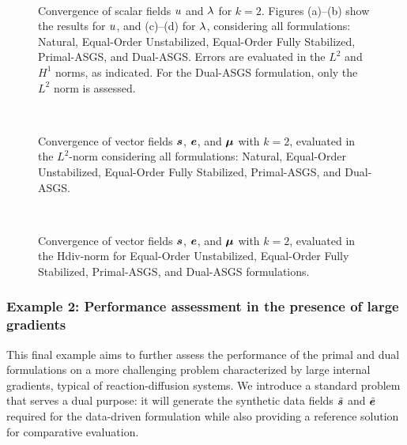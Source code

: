 
\begin{figure}[h!]
	\centering
	\caption{Convergence of scalar fields $u$ and $\lambda$ for $k = 2$. Figures (a)--(b) show the results for $u$, and (c)--(d) for $\lambda$, considering all formulations: Natural, Equal-Order Unstabilized, Equal-Order Fully Stabilized, Primal-ASGS, and Dual-ASGS. Errors are evaluated in the $L^2$ and $H^1$ norms, as indicated. For the Dual-ASGS formulation, only the $L^2$ norm is assessed.}
	~\\
	\def\svgwidth{1.0\columnwidth}
	
	\label{fig:convergence_scalar_quadratic_art02}
\end{figure}

\begin{figure}[h!]
	\centering
	\caption{Convergence of vector fields $\bm{s}$, $\bm{e}$, and $\bm{\mu}$ with $k=2$, evaluated in the $L^{2}$-norm considering all formulations: Natural, Equal-Order Unstabilized, Equal-Order Fully Stabilized, Primal-ASGS, and Dual-ASGS.}
	~\\
	\def\svgwidth{1.0\columnwidth}
	
	\label{fig:convergence_vector_quadratic_art02}
\end{figure}

\begin{figure}[h!]
	\centering
	\caption{Convergence of vector fields $\bm{s}$, $\bm{e}$, and $\bm{\mu}$ with $k=2$, evaluated in the Hdiv-norm for Equal-Order Unstabilized, Equal-Order Fully Stabilized, Primal-ASGS, and Dual-ASGS formulations.}
	~\\
	\def\svgwidth{1.0\columnwidth}
	
	\label{fig:convergence_vector_quadratic_hdiv_art02}
\end{figure}

\clearpage
\subsubsection{Example 2: Performance assessment in the presence of large gradients}

This final example aims to further assess the performance of the primal and dual formulations on a more challenging problem characterized by large internal gradients, typical of reaction-diffusion systems. We introduce a standard problem that serves a dual purpose: it will generate the synthetic data fields $\tilde{\bm{s}}$ and $\tilde{\bm{e}}$ required for the data-driven formulation while also providing a reference solution for comparative evaluation.

